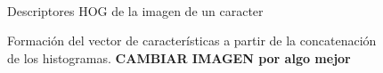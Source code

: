 \begin{figure}[htbp]
{			}
			\\
			\caption{Descriptores HOG de la imagen de un caracter}
			\label{fig: HOG features}
		\end{figure}	

		\begin{figure}[htbp]
			\centering
			\caption[Vector HOG]{Formación del vector de características a partir de la concatenación de los histogramas. \textbf{CAMBIAR IMAGEN por algo mejor}}
			\label{fig: Vector HOG}
		\end{figure}
